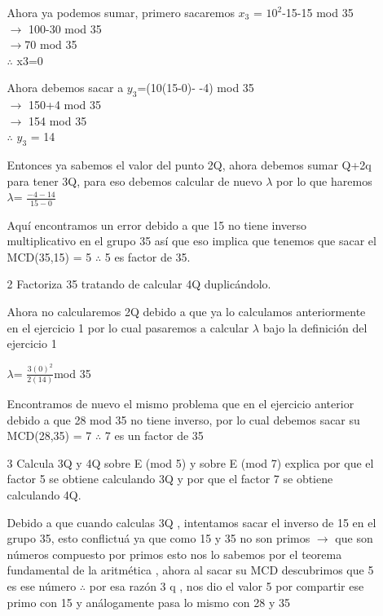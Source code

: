 \documentclass[11pt,letterpaper]{article}
\begin{document}
\begin{enumerate}
\begin{itemize}
 Ahora ya podemos sumar, primero sacaremos $x_3$ = $10^2$-15-15 mod 35 \\
 $\rightarrow$ 100-30 mod 35\\
 $\rightarrow$70 mod 35\\
 $\therefore$ x3=0\vspace{.3cm}
 
 Ahora debemos sacar a $y_3$=(10(15-0)- -4) mod 35 \\
 $\rightarrow$ 150+4 mod 35\\
 $\rightarrow$ 154 mod 35\\
$\therefore$ $y_3$ = 14  

Entonces ya sabemos el valor del punto 2Q, ahora debemos sumar Q+2q para tener 3Q, para eso debemos calcular de nuevo $\lambda$ por lo que haremos\vspace{.3cm}
$\lambda$= $\frac{-4-14} {15-0}$\vspace{.3cm}

Aquí encontramos un error debido a que 15 no tiene inverso multiplicativo en el grupo 35 así que eso implica que tenemos que sacar el MCD(35,15) = 5 $\therefore$ 5 es factor de 35.

\item[2] Factoriza 35 tratando de calcular 4Q duplicándolo.

Ahora no calcularemos 2Q debido a que ya lo calculamos anteriormente en el ejercicio 1 por lo cual pasaremos a calcular $\lambda$ bajo la definición del ejercicio 1\vspace{.3cm} 

$\lambda$= $\frac{3(0)^2}{2(14)}$mod 35 \vspace{.3cm}

Encontramos de nuevo el mismo problema que en el ejercicio anterior debido a que 28 mod 35  no tiene inverso, por lo cual debemos sacar su MCD(28,35) = 7 $\therefore$ 7 es un factor de 35 

\item[3] Calcula 3Q y 4Q sobre E (mod 5) y sobre E (mod 7) explica por que el factor 5
se obtiene calculando 3Q y por que el factor 7 se obtiene calculando 4Q.

Debido a que cuando calculas 3Q , intentamos sacar el inverso de 15 en el grupo 35, esto conflictuá ya que como 15 y 35 no son primos $\rightarrow$ que son números compuesto por primos esto nos lo sabemos por el teorema fundamental de la aritmética , ahora al sacar su MCD descubrimos que 5 es ese número $\therefore$ por esa razón 3 q , nos dio el valor 5 por compartir ese primo con 15 y análogamente pasa lo mismo con 28 y 35 


\end{itemize}
\end{enumerate}
\end{document}
